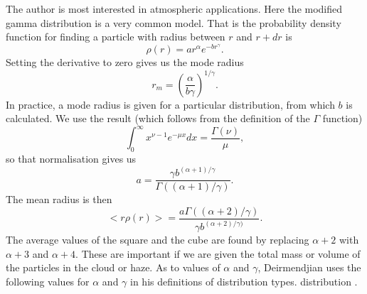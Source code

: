 The author is most interested in atmospheric applications. Here the  modified
gamma distribution is a very common model.
That is the probability density function for finding a particle
with radius between $r$ and $r+dr$ is
\begin{equation}
\rho(r)= a r^\alpha e^{-b r^\gamma}.
\end{equation}
Setting the derivative to zero gives us the mode radius
\begin{equation}
r_m= \left ( \frac{\alpha}{ b \gamma } \right )^{1/\gamma}.
\end{equation}
In practice, a mode radius is given for a particular distribution, from which 
$b$ is calculated.
We use the result (which follows from the definition of the $\Gamma$ function)
\begin{equation}
\int_0^\infty x^{\nu-1} e^{-\mu x} d x= \frac{\Gamma (\nu)}{\mu},
\end{equation}
so that normalisation gives us
\begin{equation}
a= \frac{ \gamma b^{ (\alpha+1)/\gamma } }{ \Gamma((\alpha+1)/\gamma) }.
\end{equation}
The mean radius is then
\begin{equation}
< r \rho(r)> =\frac{ a \Gamma((\alpha+2)/\gamma) }{ \gamma b^{(\alpha+2)/\gamma)} }.
\end{equation}
The average values of the square and the cube are found by replacing
$\alpha+2$ with $\alpha+3$ and $\alpha+4$. These are important if
we are given the total mass or volume of the particles in the cloud or haze.
As to values of $\alpha$ and $\gamma$,
Deirmendjian uses the following values for $\alpha$ and $\gamma$ in his definitions
of distribution types.
distribution \cite{Deirmendjian:Mybib}. 
